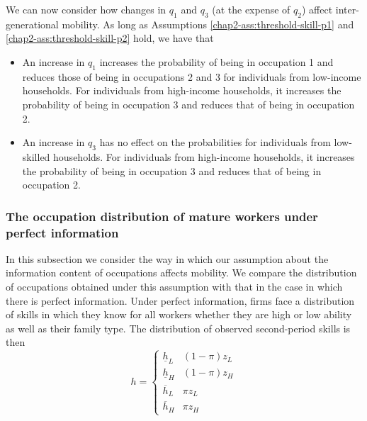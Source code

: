 We can now consider how changes in $q_{1}$ and $q_{3}$ (at the expense of $q_{2}$) affect inter-generational mobility. As long as Assumptions \ref{chap2-ass:threshold-skill-p1} and \ref{chap2-ass:threshold-skill-p2} hold, we have that
\begin{itemize}
    \item An increase in $q_{1}$ increases the probability of being in occupation 1 and reduces those of being in occupations 2 and 3 for individuals from low-income households. For individuals from high-income households, it increases the probability of being in occupation 3 and reduces that of being in occupation 2.
    \item An increase in $q_{3}$ has no effect on the probabilities for individuals from low-skilled households. For individuals from high-income households, it increases the probability of being in occupation 3 and reduces that of being in occupation 2.
\end{itemize}

\subsubsection{The occupation distribution of mature workers under perfect information }

In this subsection we consider the way in which our assumption about the information content of occupations affects mobility. We compare the distribution of occupations obtained under this assumption with that in the case in which there is perfect information. Under perfect information, firms face a distribution of skills in which they know for all workers whether they are high or low ability as well as their family type. The distribution of observed second-period skills is then
\begin{equation*}
    h=\left\{ 
    \begin{array}{cc}
        \underline{h}_{L} & (1-\pi )z_{L} \\ 
        \underline{h}_{H} & (1-\pi )z_{H} \\ 
        \overline{h}_{L} & \pi z_{L} \\ 
        \overline{h}_{H} & \pi z_{H}%
    \end{array}%
    \right.  
\end{equation*}

